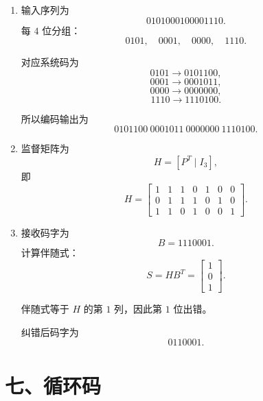 \documentclass[UTF8,a4paper,12pt]{ctexart}
\begin{document}
\begin{enumerate}[label=\arabic*., leftmargin=2em]
\item 输入序列为
\[
0101000100001110.
\]
每 $4$ 位分组：
\[
0101,\quad 0001,\quad 0000,\quad 1110.
\]

对应系统码为
\[
0101\to 0101100,
\]
\[
0001\to 0001011,
\]
\[
0000\to 0000000,
\]
\[
1110\to 1110100.
\]

所以编码输出为
\[
0101100\ 0001011\ 0000000\ 1110100.
\]

\item 监督矩阵为
\[
H=\left[P^T\mid I_3\right],
\]
即
\[
H=
\begin{bmatrix}
1&1&1&0&1&0&0\\
0&1&1&1&0&1&0\\
1&1&0&1&0&0&1
\end{bmatrix}.
\]

\item 接收码字为
\[
B=1110001.
\]
计算伴随式：
\[
S=HB^T
=
\begin{bmatrix}
1\\0\\1
\end{bmatrix}.
\]

伴随式等于 $H$ 的第 $1$ 列，因此第 $1$ 位出错。

纠错后码字为
\[
0110001.
\]
\end{enumerate}

\section*{七、循环码}
\end{document}
